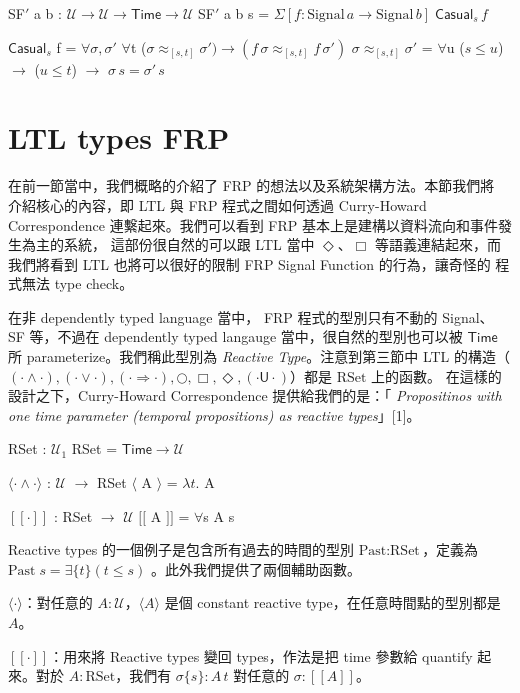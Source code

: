\documentclass{article}
\newcommand{\llens}{[\![}
\newcommand{\rlens}{]\!]}
\newcommand{\Time}{\mathsf{Time}}
\newcommand{\TU}{\mathsf{U}}
\newcommand{\U}{\mathcal{U}}
\newcommand{\Gs}{\sigma}
\newcommand{\E}[1]{\Sigma[#1]\;}
\begin{document}
  \begin{code}
  SF$'$ a b : $\U\to\U\to\Time\to\U$
  SF$'$ a b s = $\E{f: \text{Signal}\, a \to \text{Signal}\, b} \mathsf{Casual}_s\, f$

  $\mathsf{Casual}_s$ f = $\forall{\sigma,\sigma'}$ $\forall${t} ($\sigma\approx_{[s,t]}\sigma')\to(f\,\sigma\approx_{[s,t]} f\,\sigma')$
  $\sigma\approx_{[s,t]}\sigma'$ = $\forall${u} ($s\le u$) $\to$ ($u\le t$) $\to$ $\sigma\,s=\sigma'\,s$
  \end{code}
\section{LTL types FRP}
  在前一節當中，我們概略的介紹了 FRP 的想法以及系統架構方法。本節我們將
  介紹核心的內容，即 LTL 與 FRP 程式之間如何透過 Curry-Howard Correspondence
  連繫起來。我們可以看到 FRP 基本上是建構以資料流向和事件發生為主的系統，
  這部份很自然的可以跟 LTL 當中 $\Diamond$、$\Box$ 等語義連結起來，而
  我們將看到 LTL 也將可以很好的限制 FRP Signal Function 的行為，讓奇怪的
  程式無法 type check。

  在非 dependently typed language 當中， FRP 程式的型別只有不動的 Signal、
  SF 等，不過在 dependently typed langauge 當中，很自然的型別也可以被 $\Time$
  所 parameterize。我們稱此型別為 \emph{Reactive Type}。注意到第三節中
  LTL 的構造（$(\cdot\land\cdot), (\cdot\lor\cdot), (\cdot\Rightarrow\cdot),\bigcirc,\Box,\Diamond,(\cdot\TU\cdot)$）都是 $\text{RSet}$ 上的函數。
  在這樣的設計之下，Curry-Howard Correspondence 提供給我們的是：「
  \emph{Propositinos with one time parameter (temporal propositions) as reactive types}」[1]。

  \begin{code}
  RSet : $\U_1$
  RSet = $\Time\to\U$

  $\langle\cdot\land\cdot\rangle$ : $\U$ $\to$ RSet
  $\langle$ A $\rangle$ = $\lambda t.$ A

  $\llens\cdot\rlens$ : RSet $\to$ $\U$
  $\llens$ A $\rlens$ = $\forall${s} A s
  \end{code}

  Reactive types 的一個例子是包含所有過去的時間的型別
  $\text{Past} : \text{RSet}$，定義為 $\text{Past}\; s = \exists\{t\} (t\le s)$
  。此外我們提供了兩個輔助函數。
  \begin{enumerate*}
    \item $\langle\cdot\rangle$：對任意的 $A:\U$，$\langle A\rangle$ 是個
    constant reactive type，在任意時間點的型別都是 $A$。
    \item $\llens\cdot\rlens$：用來將 Reactive types 變回 types，作法是把
    time 參數給 quantify 起來。對於 $A:\text{RSet}$，我們有 $\Gs\{s\}:A\,t$
    對任意的 $\Gs:\llens A\rlens$。
  \end{enumerate*}
\end{document}
